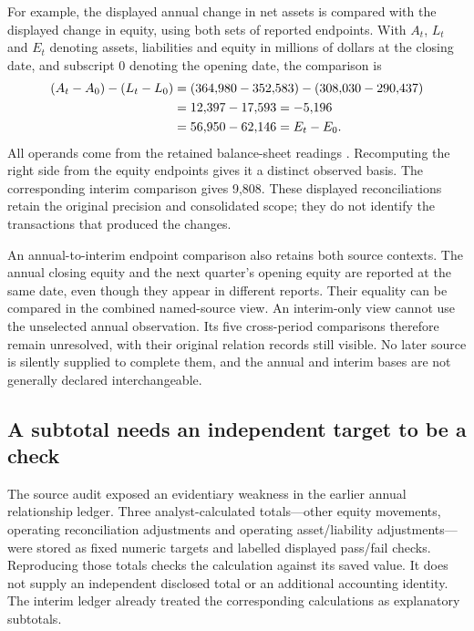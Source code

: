For example, the displayed annual change in net assets is compared with the
displayed change in equity, using both sets of reported endpoints. With
\(A_t\), \(L_t\) and \(E_t\) denoting assets, liabilities and equity in
millions of dollars at the closing date, and subscript \(0\) denoting
the opening date, the comparison is
\begin{align}
\label{eq:statement-context-equity-change}
 (A_t-A_0)-(L_t-L_0)
 &= (364{,}980-352{,}583)-(308{,}030-290{,}437)\notag\\
 &=12{,}397-17{,}593=-5{,}196\notag\\
 &=56{,}950-62{,}146=E_t-E_0.
\end{align}
All operands come from the retained balance-sheet readings
\citep[p.~31]{apple2024}. Recomputing the right side from the equity
endpoints gives it a distinct observed basis. The corresponding interim
comparison gives 9,808. These displayed reconciliations retain the original
precision and consolidated scope; they do not identify the transactions
that produced the changes.

An annual-to-interim endpoint comparison also retains both source contexts.
The annual closing equity and the next quarter's opening equity are
reported at the same date, even though they appear in different reports.
Their equality can be compared in the combined named-source view. An
interim-only view cannot use the unselected annual observation. Its five
cross-period comparisons therefore remain unresolved, with their original
relation records still visible. No later source is silently supplied to
complete them, and the annual and interim bases are not generally declared
interchangeable.

\subsection{A subtotal needs an independent target to be a check}

The source audit exposed an evidentiary weakness in the earlier annual
relationship ledger. Three analyst-calculated totals---other equity
movements, operating reconciliation adjustments and operating asset/liability
adjustments---were stored as fixed numeric targets and labelled displayed
pass/fail checks. Reproducing those totals checks the calculation against
its saved value. It does not supply an independent disclosed total or an
additional accounting identity. The interim ledger already treated the
corresponding calculations as explanatory subtotals.

